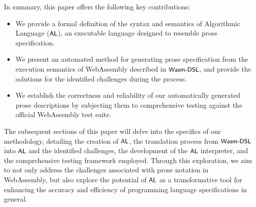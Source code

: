 In summary, this paper offers the following key contributions:

\begin{itemize}
\item We provide a formal definition of the syntax and semantics of
Algorithmic Language ($\textsf{\small AL}$), an executable language designed to resemble prose
specification.
\item We present an automated method for generating prose specification from
the execution semantics of WebAssembly described in $\textsf{\small Wasm-DSL}$, and provide the solutions for
the identified challenges during the process.
\item We establish the correctness and reliability of our automatically
generated prose descriptions by subjecting them to comprehensive testing
against the official WebAssembly test suite.
\end{itemize}

The subsequent sections of this paper will delve into the specifics of our
methodology, detailing the creation of $\textsf{\small AL}$, the translation process from
$\textsf{\small Wasm-DSL}$ into $\textsf{\small AL}$ and the identified challenges, the development of the $\textsf{\small AL}$
interpreter, and the comprehensive testing framework employed. Through this
exploration, we aim to not only address the challenges associated with prose
notation in WebAssembly, but also explore the potential of $\textsf{\small AL}$ as a transformative
tool for enhancing the accuracy and efficiency of programming language
specifications in general.
